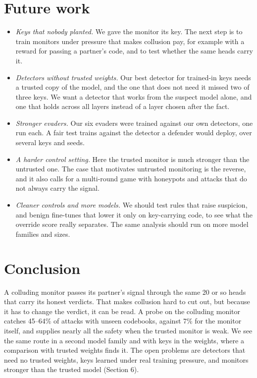 \documentclass[11pt,letterpaper]{article}
\providecommand{\tightlist}{\setlength{\itemsep}{1pt}\setlength{\parskip}{0pt}}
\begin{document}
\section{Future work}

\begin{itemize}
\tightlist
\item
  \emph{Keys that nobody planted.} We gave the monitor its key. The next step is to train monitors under pressure that makes collusion pay, for example with a reward for passing a partner's code, and to test whether the same heads carry it.
\item
  \emph{Detectors without trusted weights.} Our best detector for trained-in keys needs a trusted copy of the model, and the one that does not need it missed two of three keys. We want a detector that works from the suspect model alone, and one that holds across all layers instead of a layer chosen after the fact.
\item
  \emph{Stronger evaders.} Our six evaders were trained against our own detectors, one run each. A fair test trains against the detector a defender would deploy, over several keys and seeds.
\item
  \emph{A harder control setting.} Here the trusted monitor is much stronger than the untrusted one. The case that motivates untrusted monitoring is the reverse, and it also calls for a multi-round game with honeypots and attacks that do not always carry the signal.
\item
  \emph{Cleaner controls and more models.} We should test rules that raise suspicion, and benign fine-tunes that lower it only on key-carrying code, to see what the override score really separates. The same analysis should run on more model families and sizes.
\end{itemize}

\section{Conclusion}

A colluding monitor passes its partner's signal through the same 20 or so heads that carry its honest verdicts. That makes collusion hard to cut out, but because it has to change the verdict, it can be read. A probe on the colluding monitor catches 45--64\% of attacks with unseen codebooks, against 7\% for the monitor itself, and supplies nearly all the safety when the trusted monitor is weak. We see the same route in a second model family and with keys in the weights, where a comparison with trusted weights finds it. The open problems are detectors that need no trusted weights, keys learned under real training pressure, and monitors stronger than the trusted model (Section 6).
\end{document}
